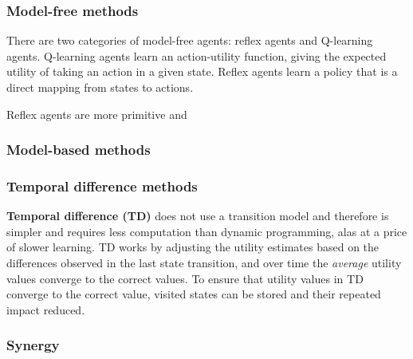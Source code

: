 \subsubsection{Model-free methods}
\label{sec:ai:model_free}

There are two categories of model-free agents: reflex agents and Q-learning
agents. Q-learning agents learn an action-utility function, giving the expected
utility of taking an action in a given state. Reflex agents learn a policy that
is a direct mapping from states to actions.

Reflex agents are more primitive and 


\subsubsection{Model-based methods}
\label{sec:ai:model_based}


\subsubsection{Temporal difference methods}
\label{sec:ai:temporal}

\textbf{Temporal difference (TD)} does not use a transition model and therefore
is simpler and requires less computation than dynamic programming, alas at a
price of slower learning. TD works by adjusting the utility estimates based on
the differences observed in the last state transition, and over time the
\textit{average} utility values converge to the correct values. To ensure that
utility values in TD converge to the correct value, visited states can be
stored and their repeated impact reduced. \parencite{Russell2010ai+modern}


\subsubsection{Synergy}
\label{sec:ai:synergy}
